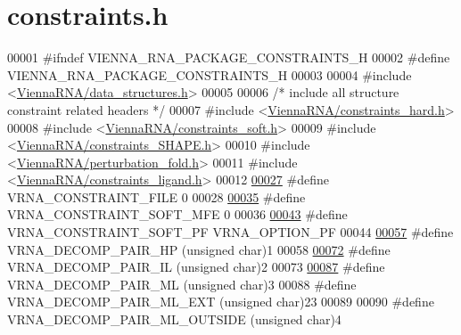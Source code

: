 \hypertarget{constraints_8h_source}{}\section{constraints.\+h}
\label{constraints_8h_source}

\begin{DoxyCode}
00001 \textcolor{preprocessor}{#ifndef VIENNA\_RNA\_PACKAGE\_CONSTRAINTS\_H}
00002 \textcolor{preprocessor}{#define VIENNA\_RNA\_PACKAGE\_CONSTRAINTS\_H}
00003 
00004 \textcolor{preprocessor}{#include <\hyperlink{data__structures_8h}{ViennaRNA/data\_structures.h}>}
00005 
00006 \textcolor{comment}{/* include all structure constraint related headers */}
00007 \textcolor{preprocessor}{#include <\hyperlink{constraints__hard_8h}{ViennaRNA/constraints\_hard.h}>}
00008 \textcolor{preprocessor}{#include <\hyperlink{constraints__soft_8h}{ViennaRNA/constraints\_soft.h}>}
00009 \textcolor{preprocessor}{#include <\hyperlink{constraints__SHAPE_8h}{ViennaRNA/constraints\_SHAPE.h}>}
00010 \textcolor{preprocessor}{#include <\hyperlink{perturbation__fold_8h}{ViennaRNA/perturbation\_fold.h}>}
00011 \textcolor{preprocessor}{#include <\hyperlink{constraints__ligand_8h}{ViennaRNA/constraints\_ligand.h}>}
00012 
\hyperlink{group__constraints_ga62e0ed0c33002c09423de4e646f85a2b}{00027} \textcolor{preprocessor}{#define VRNA\_CONSTRAINT\_FILE      0}
00028 
\hyperlink{group__constraints_ga62aa195893d02d1a79ca94952748df36}{00035} \textcolor{preprocessor}{#define VRNA\_CONSTRAINT\_SOFT\_MFE  0}
00036 
\hyperlink{group__constraints_ga03fb5000c19b9a2082bf4ea30a543045}{00043} \textcolor{preprocessor}{#define VRNA\_CONSTRAINT\_SOFT\_PF   VRNA\_OPTION\_PF}
00044 
\hyperlink{group__constraints_ga8bd41ebc8039378d242e4e8c273716a5}{00057} \textcolor{preprocessor}{#define VRNA\_DECOMP\_PAIR\_HP     (unsigned char)1}
00058 
\hyperlink{group__constraints_gaeab04f34d7730cff2d651d782f95d857}{00072} \textcolor{preprocessor}{#define VRNA\_DECOMP\_PAIR\_IL     (unsigned char)2}
00073 
\hyperlink{group__constraints_gaa15b1185673f0b9e900c4748d45f388f}{00087} \textcolor{preprocessor}{#define VRNA\_DECOMP\_PAIR\_ML     (unsigned char)3}
00088 \textcolor{preprocessor}{#define VRNA\_DECOMP\_PAIR\_ML\_EXT     (unsigned char)23}
00089 
00090 \textcolor{preprocessor}{#define VRNA\_DECOMP\_PAIR\_ML\_OUTSIDE     (unsigned char)4}

\end{DoxyCode}
